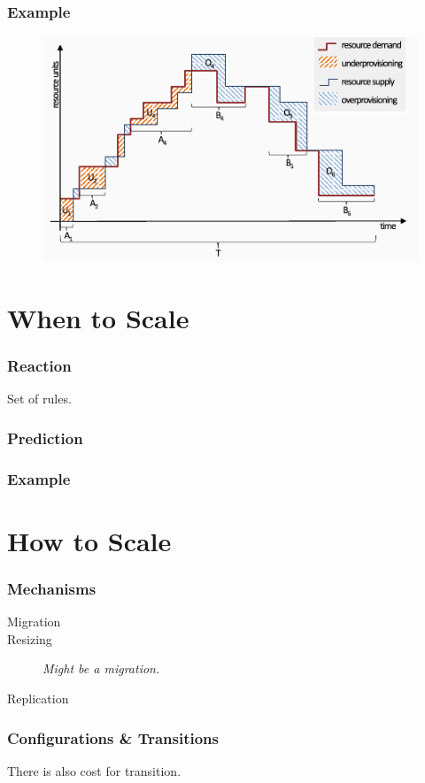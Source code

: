 \documentclass{beamer}
\begin{document}
\begin{frame}
  \frametitle{Example~\cite{herbst2013elasticity}}
  \begin{figure}
    \includegraphics[clip, width=\textwidth]{images/workload}
  \end{figure}
\end{frame}


\section{When to Scale}
\begin{frame}
  \frametitle{Reaction}
  Set of rules.
\end{frame}

\begin{frame}
  \frametitle{Prediction}
\end{frame}

\begin{frame}
  \frametitle{Example~\cite{moore2013coordinated}}
\end{frame}


\section{How to Scale}
\begin{frame}
  \frametitle{Mechanisms}
  \begin{description}
    \item[Migration]
    \item[Resizing] \textit{Might be a migration.}
    \item[Replication]
  \end{description}
\end{frame}

\begin{frame}
  \frametitle{Configurations \& Transitions}
  \vspace*{\fill}
  There is also cost for transition.
\end{frame}
\end{document}
